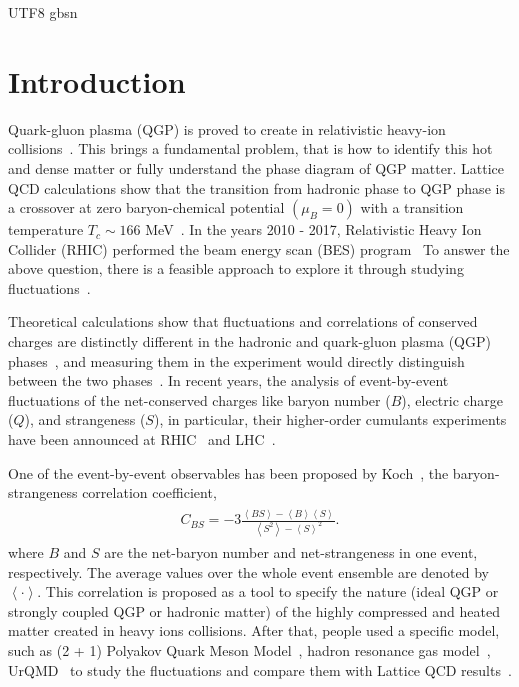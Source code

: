 \documentclass[twocolumn,showpacs,preprintnumbers,superscriptaddress,amsmath,amssymb]{revtex4}
\begin{document}
\begin{CJK*} {UTF8} {gbsn}
	\section{Introduction}
	\par
	Quark-gluon plasma (QGP) is proved to create in relativistic heavy-ion collisions~\cite{phase_e1,phase_e2,phase_e3,phase_e4}. 
	This brings a fundamental problem, that is how to identify this hot and dense matter or fully understand the phase diagram of QGP matter.
	Lattice QCD calculations show that the transition from hadronic phase to QGP phase is a crossover at zero baryon-chemical potential $(\mu_{B}=0)$ 
	with a transition temperature $T_{c}\sim166$ MeV~\cite{tc_1,tc_2}.
	In the years 2010 - 2017, Relativistic Heavy Ion Collider (RHIC) performed the beam energy scan (BES) program~\cite{bes_1,bes_2,bes_3}
	To answer the above question, there is a feasible approach to explore it through studying fluctuations~\cite{koch_re,jeon2003eventbyevent}.
	
	\par
	Theoretical calculations show that fluctuations and correlations of conserved charges are distinctly different in the hadronic and quark-gluon plasma (QGP) phases~\cite{LuoNST},
	and measuring them in the experiment would directly distinguish between the two phases~\cite{Adare_2016}.
	In recent years, the analysis of event-by-event fluctuations of the net-conserved charges like baryon number ($B$), electric charge ($Q$), and strangeness ($S$), in particular, their higher-order cumulants experiments have been announced at RHIC~\cite{exp_1,exp_2} and LHC~\cite{exp_3,exp_4}.
	
	
	
	One of the event-by-event observables has been proposed by Koch~\cite{Koch_origin}, the baryon-strangeness correlation coefficient,
	\begin{eqnarray}%
	\begin{aligned}
	 C_{BS} = -3\frac{\left\langle BS \right\rangle - \left\langle B \right\rangle \left\langle S \right\rangle}{\left\langle S^{2}  \right\rangle - \left\langle S \right\rangle^{2}}.
	 \end{aligned}
	\end{eqnarray}%
	where $B$ and $S$ are the net-baryon number and net-strangeness in one event, respectively.
	The average values over the whole event ensemble are denoted by $\left\langle \cdot \right\rangle$.
	This correlation is proposed as a tool to specify the nature (ideal QGP or strongly coupled QGP or hadronic matter) of the highly compressed and heated matter created in heavy ions collisions.
	After that, people used a specific model, such as (2 + 1) Polyakov Quark Meson Model~\cite{u_model1}, 
	hadron resonance gas model~\cite{u_model2,u_model3}, UrQMD~\cite{u_model4,Haussler_2007,Luo_UrQMD}
	 to study the fluctuations and compare them with Lattice QCD results~\cite{lattice_1,lattice_2}.
	

\end{CJK*}
\end{document}
